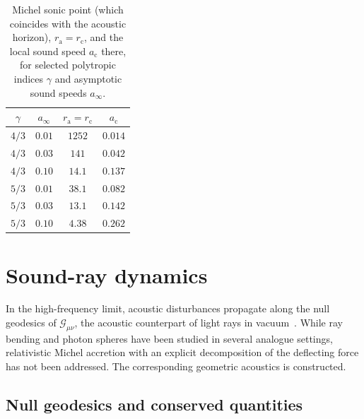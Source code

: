 \documentclass[12pt,a4paper,preprint]{elsarticle}
\begin{document}
            \begin{table}[htb]
                \centering
                \caption{Michel sonic point (which coincides with the acoustic horizon), $r_{\mathrm{a}}=r_{\mathrm{c}}$, and the local sound speed $a_{\mathrm{c}}$ there, for selected polytropic indices $\gamma$ and asymptotic sound speeds $a_{\infty}$.}
                \label{tab:sonic-point}
                {\small
                \begin{tabular}{cccc}
                    \toprule
                    $\gamma$ & $a_{\infty}$ & $r_{\mathrm{a}}=r_{\mathrm{c}}$ & $a_{\mathrm{c}}$ \\
                    \midrule
                    $4/3$ & $0.01$ & $1252$ & $0.014$ \\
                    $4/3$ & $0.03$ & $141$  & $0.042$ \\
                    $4/3$ & $0.10$ & $14.1$ & $0.137$ \\
                    $5/3$ & $0.01$ & $38.1$ & $0.082$ \\
                    $5/3$ & $0.03$ & $13.1$ & $0.142$ \\
                    $5/3$ & $0.10$ & $4.38$ & $0.262$ \\
                    \bottomrule
                \end{tabular}
                }
            \end{table}

    \section{Sound-ray dynamics}\label{sec:rays}

        In the high-frequency limit, acoustic disturbances propagate along the null geodesics of $\mathcal{G}_{\mu\nu}$, the acoustic counterpart of light rays in vacuum~\cite{VisserM_AcousticBlackHolesHorizonsErgospheresAndHawkingRadiation_1998, BarceloC_LiberatiS_VisserM_AnalogueGravity_2011}. While ray bending and photon spheres have been studied in several analogue settings, relativistic Michel accretion with an explicit decomposition of the deflecting force has not been addressed. The corresponding geometric acoustics is constructed.

        \subsection{Null geodesics and conserved quantities}\label{subsec:null-geodesics}
\end{document}
